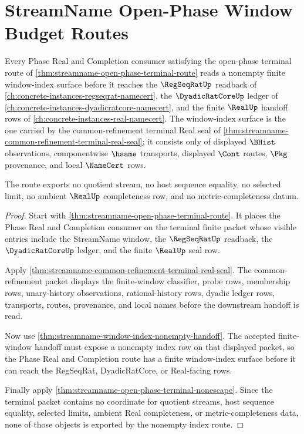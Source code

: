 \section{StreamName Open-Phase Window Budget Routes}
\label{sec:streamname-open-phase-window-budget-routes}

\begin{theorem}
\label{thm:streamname-open-phase-window-index-nonempty}
Every Phase Real and Completion consumer satisfying the open-phase terminal route of \autoref{thm:streamname-open-phase-terminal-route} reads a nonempty finite window-index surface before it reaches the $\RegSeqRatUp$ readback of \autoref{ch:concrete-instances-regseqrat-namecert}, the $\DyadicRatCoreUp$ ledger of \autoref{ch:concrete-instances-dyadicratcore-namecert}, and the finite $\RealUp$ handoff rows of \autoref{ch:concrete-instances-real-namecert}. The window-index surface is the one carried by the common-refinement terminal Real seal of \autoref{thm:streamname-common-refinement-terminal-real-seal}; it consists only of displayed $\BHist$ observations, componentwise $\hsame$ transports, displayed $\Cont$ routes, $\Pkg$ provenance, and local $\NameCert$ rows.

The route exports no quotient stream, no host sequence equality, no selected limit, no ambient $\RealUp$ completeness row, and no metric-completeness datum.
\end{theorem}
\begin{proof}
Start with \autoref{thm:streamname-open-phase-terminal-route}. It places the Phase Real and Completion consumer on the terminal finite packet whose visible entries include the StreamName window, the $\RegSeqRatUp$ readback, the $\DyadicRatCoreUp$ ledger, and the finite $\RealUp$ seal row.

Apply \autoref{thm:streamname-common-refinement-terminal-real-seal}. The common-refinement packet displays the finite-window classifier, probe rows, membership rows, unary-history observations, rational-history rows, dyadic ledger rows, transports, routes, provenance, and local names before the downstream handoff is read.

Now use \autoref{thm:streamname-window-index-nonempty-handoff}. The accepted finite-window handoff must expose a nonempty index row on that displayed packet, so the Phase Real and Completion route has a finite window-index surface before it can reach the RegSeqRat, DyadicRatCore, or Real-facing rows.

Finally apply \autoref{thm:streamname-open-phase-terminal-nonescape}. Since the terminal packet contains no coordinate for quotient streams, host sequence equality, selected limits, ambient Real completeness, or metric-completeness data, none of those objects is exported by the nonempty index route.
\end{proof}


